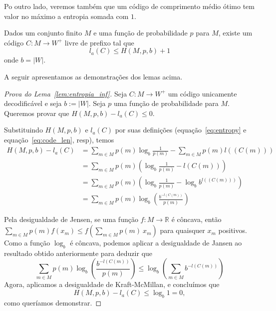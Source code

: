 Po outro lado, veremos também que um código de comprimento médio ótimo
tem valor no máximo a entropia somada com $1$.

\begin{lemma}
  \label{lem:entropia_sup}
  Dados um conjunto finito $M$ e uma função de probabilidade $p$ para
  $M$, existe um código $C:M\to W^+$ livre de prefixo tal que
  \begin{equation*}
    l_a(C) \leq H(M, p, b) + 1
  \end{equation*}
  onde $b = |W|$.
\end{lemma}

  A seguir apresentamos as demonstrações dos lemas acima.
  
  \begin{proof}[Prova do Lema~\ref{lem:entropia_inf}]
    Seja $C:M\to W^+$ um código unicamente decodificável e seja $b :=
    |W|$. Seja $p$ uma função de probabilidade para $M$. Queremos
    provar que $H(M, p,b) - l_a(C) \leq 0$.

    Substituindo $H(M,p, b)$ e $l_a(C)$ por suas definições
    (equação~\eqref{eq:entropy} e equação~\eqref{eq:code_len}, resp),
    temos
    \begin{align*}
      H(M, p, b) - l_a(C)
      &=
      \sum_{m \in M} p(m) \log_b \frac{1}{p(m)}
      - \sum_{m \in M}^{}p(m) l((C(m))) \\
      &=
      \sum_{m \in M} p(m) \left(
      \log_b \frac{1}{p(m)} - l(C(m))
      \right) \\
      &=
      \sum_{m \in M} p(m) \left(
      \log_b \frac{1}{p(m)} - \log_b b^{l((C(m)))}
      \right) \\
      &= \sum_{m \in M}^{}p(m) \log_b \left(\frac{b^{-l(C(m))}}{p(m)}\right)
    \end{align*}

    Pela desigualdade de Jensen, se uma função $f:M\to\mathbb{R}$ é
    côncava, então $\sum_{m\in M} p(m) f(x_m) \leq f(\sum_{m\in M}
    p(m)~x_m)$ para quaisquer $x_m$ positivos. Como a função $\log_b$
    é côncava, podemos aplicar a desigualdade de Jansen ao resultado
    obtido anteriormente para deduzir que
\begin{equation*}
  \sum_{m \in M}^{}p(m) \log_b  \left(\frac{b^{-l(C(m))}}{p(m)}\right)
  \leq
  \log_b\left(\sum_{m \in M} b^{-l(C(m))}\right)
\end{equation*}
Agora, aplicamos a desigualdade de Kraft-McMillan, e concluímos que
\begin{equation*}
  H(M, p, b) - l_a(C)
  \leq
  \log_b 1 = 0,
\end{equation*}
como queríamos demonstrar.
\end{proof}


